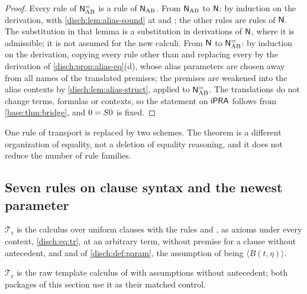 \begin{proof}
Every rule of $\mathsf{N}^{=}_{\mathrm{AB}}$ is a rule of $\mathsf{N}_{\mathrm{AB}}$.
From $\mathsf{N}_{\mathrm{AB}}$ to $\mathsf{N}$: by induction on the derivation, with
\cref{disch:lem:alias-sound} at  and ; the
other rules are rules of $\mathsf{N}$. The substitution in that lemma is a
substitution in derivations of $\mathsf{N}$, where it is admissible; it is not
assumed for the new calculi. From $\mathsf{N}$ to $\mathsf{N}^{=}_{\mathrm{AB}}$: by
induction on the derivation, copying every rule other than 
and replacing every  by the derivation of
\cref{disch:prop:alias-eq}(d), whose alias parameters are chosen away from
all names of the translated premises; the premises are weakened into the
alias contexts by \cref{disch:lem:alias-struct}, applied to
$\mathsf{N}^{=}_{\mathrm{AB}}$. The translations do not change terms, formulas
or contexts, so the statement on $\mathsf{iPRA}$ follows from
\cref{base:thm:bridge}, and $0=S 0$ is fixed.
\end{proof}

One rule of transport is replaced by two schemes. The theorem is a
different organization of equality, not a deletion of equality reasoning,
and it does not reduce the number of rule families.

\subsection{Seven rules on clause syntax and the newest parameter}
\label{disch:sec:alias-newest}

\begin{definition}
\label{disch:def:alias-tr}
$\mathcal T_{\mathrm r}$ is the calculus over uniform clauses with the
rules  and , as axioms under every context,
 \eqref{disch:eq:tr},  at an arbitrary term,
without premise for a clause without antecedent, and  and
 of \cref{disch:def:param}, the assumption of
 being $\langle B(t,\eta)\rangle$.
\end{definition}

$\mathcal T_{\mathrm r}$ is the raw template calculus of
 with assumptions without antecedent; both
packages of this section use it as their matched control.

